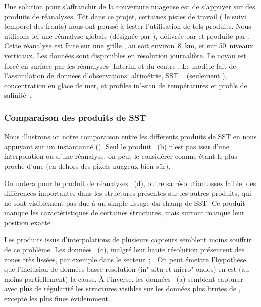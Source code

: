 Une solution pour s'affranchir de la couverture nuageuse est de s'appuyer sur des produits de réanalyses.
Tôt dans ce projet, certaines pistes de travail ( le suivi temporel des fronts) nous ont poussé à tester l'utilisation de tels produits.
Nous utilisons ici une réanalyse globale (désignée par ), délivrée par  et produite par .
Cette réanalyse est faite sur une grille , au  soit environ~\qty{8}{\km}, et sur 50~niveaux verticaux. Les données sont disponibles en résolution journalière.
Le noyau  est forcé en surface par les réanalyses -Interim et  du centre .
Le modèle fait de l'assimilation de données d'observations: altimétrie, SST ~ (seulement ), concentration en glace de mer, et profiles in"-situ de températures et profils de salinité~.

\subsubsection{Comparaison des produits de SST}

\begin{figure}
  \label{fig:comparaison-sst}
\end{figure}

Nous illustrons ici notre comparaison entre les différents produits de SST en nous appuyant sur un instantanné ().
Seul le produit ~(b) n'est pas issu d'une interpolation ou d'une réanalyse, on peut le considérer comme étant le plus proche d'une  (en dehors des pixels nuageux bien sûr).

On notera pour le produit de réanalyses ~(d), outre sa résolution assez faible, des différences importantes dans les structures présentes sur les autres produits, qui ne sont visiblement pas due à un simple lissage du champ de SST.
Ce produit manque les caractéristiques de certaines structures, mais surtout manque leur position exacte.

Les produits issus d'interpolations de plusieurs capteurs semblent moins souffrir de ce problème.
Les données ~(c), malgré leur haute résolution présentent des zones très lissées, par exemple dans le secteur~; .
On peut émettre l'hypothèse que l'inclusion de données basse-résolution (in"-situ et micro"-ondes) en est (au moins partiellement) la cause.
À l'inverse, les données ~(a) semblent capturer avec plus de régularité les structures visibles sur les données plus brutes de , excepté les plus fines évidemment.

